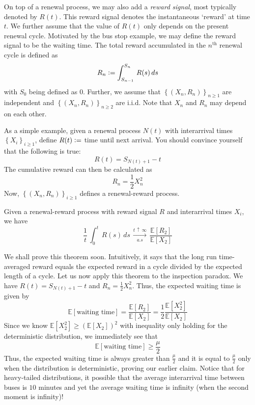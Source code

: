 \documentclass[12pt]{article}
\theoremstyle{definition}
\begin{document}
On top of a renewal process, we may also add a \emph{reward signal}, most typically denoted by $R(t)$. This reward signal denotes the instantaneous `reward' at time $t$. We further assume that the value of $R(t)$ only depends on the present renewal cycle. Motivated by the bus stop example, we may define the reward signal to be the waiting time. The total reward accumulated in the $n^{\text{th}}$ renewal cycle is defined as
\[
    R_n \vcentcolon= \int_{S_{n-1}}^{S_n} \, R(s) \, ds
\]
with $S_0$ being defined as $0$. Further, we assume that $\left\{ (X_n, R_n) \right\}_{n \geq 1}$ are independent and $\left\{ (X_n, R_n) \right\}_{n \geq 2}$ are i.i.d.  Note that $X_n$ and $R_n$ may depend on each other. 

As a simple example, given a renewal process $N(t)$ with interarrival times $\left\{ X_i \right\}_{i \geq 1}$, define $R(t) \vcentcolon=$ time until next arrival. You should convince yourself that the following is true:
\[
    R(t) = S_{N(t)+1} - t
\]
The cumulative reward can then be calculated as
\[
    R_n = \frac{1}{2} X_n^2
\]
Now, $\left\{ (X_n, R_n) \right\}_{i \geq 1}$ defines a renewal-reward process. 
\begin{thm} \label{thm:rrt}
Given a renewal-reward process with reward signal $R$ and interarrival times $X_i$, we have
\[
    \frac{1}{t} \, \int_0^t \, R(s) \, ds \, \xrightarrow[a.s]{t \, \uparrow \, \infty} \, \frac{\mathbb{E} [ R_2 ]}{\mathbb{E}[X_2]}
\]
\end{thm}

We shall prove this theorem soon. Intuitively, it says that the long run time-averaged reward equals the expected reward in a cycle divided by the expected length of a cycle. Let us now apply this theorem to the inspection paradox. We have $R(t) = S_{N(t)+1} - t$ and $R_n = \frac{1}{2} X_n^2$. Thus, the expected waiting time is given by
\[
    \mathbb{E}[ \text{waiting time}] = \frac{\mathbb{E}[R_2]}{\mathbb{E}[X_2]} = \frac{1}{2} \frac{\mathbb{E}[X^2_2]}{\mathbb{E}[X_2]}
\]
Since we know $\mathbb{E}[X_2^2] \geq \left( \mathbb{E}[X_2] \right)^2$ with inequality only holding for the deterministic distribution, we immediately see that
\[
    \mathbb{E}[ \text{waiting time}] \geq \frac{\mu}{2}
\]
Thus, the expected waiting time is always greater than $\frac{\mu}{2}$ and it is equal to $\frac{\mu}{2}$ only when the distribution is deterministic, proving our earlier claim. Notice that for heavy-tailed distributions, it possible that the average interarrival time between buses is $10$ minutes and yet the average waiting time is infinity (when the second moment is infinity)!
\end{document}
